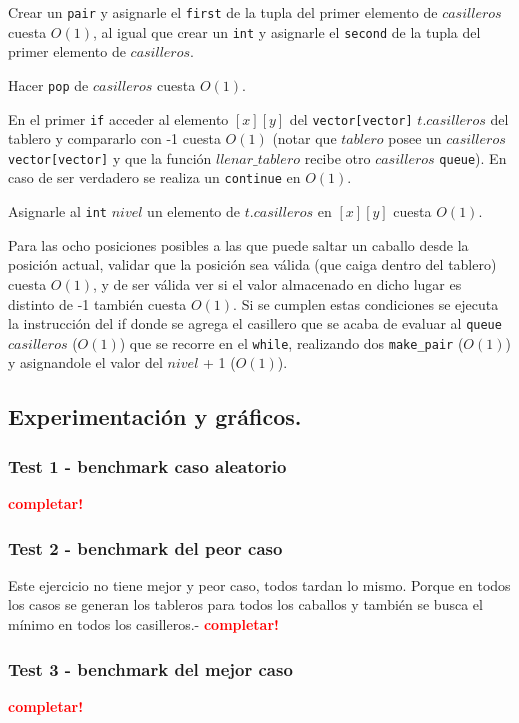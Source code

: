 \begin{enumerate}
 Crear un \verb|pair| y asignarle el \verb|first| de la tupla del primer elemento
 de $casilleros$ cuesta $O(1)$, al igual que crear un \verb|int| y asignarle el
 \verb|second| de la tupla del primer elemento de $casilleros$.

 Hacer \verb|pop| de $casilleros$ cuesta $O(1)$.

 En el primer \verb|if| acceder al elemento $[x][y]$ del \verb|vector[vector]|
 $t.casilleros$ del tablero y compararlo con -1 cuesta $O(1)$ (notar que $tablero$
 posee un $casilleros$ \verb|vector[vector]| y que la función $llenar\_tablero$ recibe otro $casilleros$
 \verb|queue|). En caso de ser verdadero se realiza un \verb|continue| en $O(1)$.

 Asignarle al \verb|int| $nivel$ un elemento de $t.casilleros$ en $[x][y]$ cuesta $O(1)$.

 Para las ocho posiciones posibles a las que puede saltar un caballo desde la posición
 actual, validar que la posición sea válida (que caiga dentro del tablero) cuesta
 $O(1)$, y de ser válida ver si el valor almacenado en dicho lugar es distinto de -1
 también cuesta $O(1)$. Si se cumplen estas condiciones se ejecuta la instrucción
 del if donde se agrega el casillero que se acaba de evaluar al \verb|queue| $casilleros$
 ($O(1)$) que se recorre en el \verb|while|, realizando dos \verb|make_pair| ($O(1)$)
 y asignandole el valor del $nivel$ + 1 ($O(1)$).
\end{enumerate}



\newpage
\subsection{Experimentación y gráficos.}

\vspace*{0.3cm}

\subsubsection{Test 1 - benchmark caso aleatorio}

\textcolor{red}{\textbf{completar!}}


\newpage
\subsubsection{Test 2 - benchmark del peor caso}

Este ejercicio no tiene mejor y peor caso, todos tardan lo mismo.
Porque en todos los casos se generan los tableros para todos los caballos
y también se busca el mínimo en todos los casilleros.-
\textcolor{red}{\textbf{completar!}}


\newpage
\subsubsection{Test 3 - benchmark del mejor caso}

\textcolor{red}{\textbf{completar!}}
